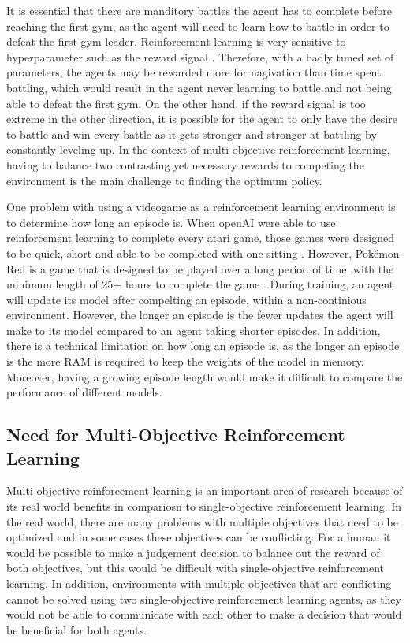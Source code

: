 It is essential that there are manditory battles the agent has to complete before reaching the first gym, as the agent will need to learn how to battle in order to defeat the first gym leader. Reinforcement learning is very sensitive to hyperparameter such as the reward signal \cite{XanderSteenbrugge2019ppo}. Therefore, with a badly tuned set of parameters, the agents may be rewarded more for nagivation than time spent battling, which would result in the agent never learning to battle and not being able to defeat the first gym. On the other hand, if the reward signal is too extreme in the other direction, it is possible for the agent to only have the desire to battle and win every battle as it gets stronger and stronger at battling by constantly leveling up. In the context of multi-objective reinforcement learning, having to balance two contrasting yet necessary rewards to competing the environment is the main challenge to finding the optimum policy. 

One problem with using a videogame as a reinforcement learning environment is to determine how long an episode is. When openAI were able to use reinforcement learning to complete every atari game, those games were designed to be quick, short and able to be completed with one sitting \cite{brockman2016openai}. However, Pokémon Red is a game that is designed to be played over a long period of time, with the minimum length of 25+ hours to complete the game \cite{howlongtobeat}. During training, an agent will update its model after compelting an episode, within a non-continious environment. However, the longer an episode is the fewer updates the agent will make to its model compared to an agent taking shorter episodes. In addition, there is a technical limitation on how long an episode is, as the longer an episode is the more RAM is required to keep the weights of the model in memory. Moreover, having a growing episode length would make it difficult to compare the performance of different models.


\subsection{Need for Multi-Objective Reinforcement Learning} 

Multi-objective reinforcement learning is an important area of research because of its real world benefits in compariosn to single-objective reinforcement learning. In the real world, there are many problems with multiple objectives that need to be optimized and in some cases these objectives can be conflicting. For a human it would be possible to make a judgement decision to balance out the reward of both objectives, but this would be difficult with single-objective reinforcement learning. In addition, environments with multiple objectives that are conflicting cannot be solved using two single-objective reinforcement learning agents, as they would not be able to communicate with each other to make a decision that would be beneficial for both agents. %

